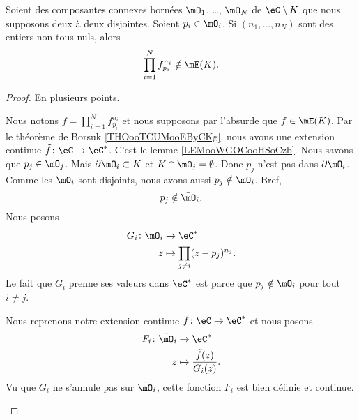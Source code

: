 \begin{lemma}     \label{LEMooOTMGooZeUoCy}
    Soient des composantes connexes bornées \( \mO_1\), \ldots, \( \mO_N\) de \( \eC\setminus K\) que nous supposons deux à deux disjointes. Soient \( p_i\in\mO_i\). Si \( (n_1,\ldots, n_N)\) sont des entiers non tous nuls, alors
    \begin{equation}
        \prod_{i=1}^Nf_{p_i}^{n_i}\notin\mE(K).
    \end{equation}
\end{lemma}

\begin{proof}
    En plusieurs points.
    \begin{subproof}
    Nous notons \( f=\prod_{i=1}^Nf_{p_i}^{n_i}\) et nous supposons par l'absurde que \( f\in\mE(K)\). Par le théorème de Borsuk \ref{THOooTCUMooEByCKg}, nous avons une extension continue \( \tilde f\colon \eC \to \eC^*\).
    C'est le lemme \ref{LEMooWGOCooHSoCzb}.
    Nous savons que \( p_j\in\mO_j\). Mais \( \partial\mO_i\subset K\) et \( K\cap\mO_j=\emptyset\). Donc \( p_j\) n'est pas dans \( \partial\mO_i\). Comme les \( \mO_i\) sont disjoints, nous avons aussi \( p_j\notin \mO_i\). Bref,
    \begin{equation}
        p_j\notin\bar\mO_i.
    \end{equation}
    Nous posons
    \begin{equation}
        \begin{aligned}
            G_i\colon \bar\mO_i&\to \eC^* \\
            z&\mapsto \prod_{j\neq i}(z-p_j)^{n_j}. 
        \end{aligned}
    \end{equation}
    Le fait que \( G_i\) prenne ses valeurs dans \( \eC^*\) est parce que \( p_j\notin \bar\mO_i\) pour tout \( i\neq j\).

    Nous reprenons notre extension continue \( \tilde f\colon \eC\to \eC^*\) et nous posons
    \begin{equation}
        \begin{aligned}
            F_i\colon \bar\mO_i&\to \eC^* \\
            z&\mapsto \frac{ \tilde f(z) }{ G_i(z) }. 
        \end{aligned}
    \end{equation}
    Vu que \( G_i\) ne s'annule pas sur \( \bar\mO_i\), cette fonction \( F_i\) est bien définie et continue.


\end{subproof}
\end{proof}
